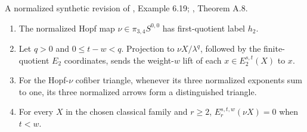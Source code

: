 \begin{theorem}
\label{frontier:Literature:0385573fba72}
A normalized synthetic revision of \cite{LWX126}, Example 6.19; \cite{BHS}, Theorem A.8.\par

\begin{enumerate}
\item The normalized Hopf map $\nu\in\pi_{3,4}S^{0,0}$ has first-quotient label $h_2$.
\item Let $q>0$ and $0\le t-w<q$. Projection to $\nu X/\lambda^q$, followed by the finite-quotient $E_2$ coordinates, sends the weight-$w$ lift of each $x\in E_2^{s,t}(X)$ to $x$.
\item For the Hopf-$\nu$ cofiber triangle, whenever its three normalized exponents sum to one, its three normalized arrows form a distinguished triangle.
\item For every $X$ in the chosen classical family and $r\ge2$, $E_r^{s,t,w}(\nu X)=0$ when $t<w$.
\end{enumerate}
\end{theorem}


